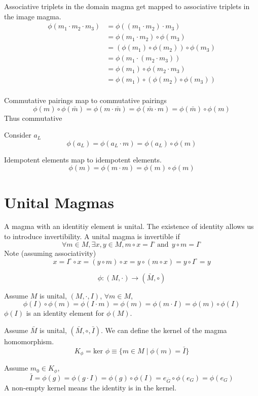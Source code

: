 \documentclass[a4paper]{scrartcl}
\begin{document}
Associative triplets in the domain magma get mapped to associative triplets in the image magma.
\begin{align*}
\phi(m_{1} \cdot m_{2} \cdot m_{3})  
&= \phi((m_{1} \cdot m_{2}) \cdot m_{3}) \\
&= \phi(m_{1} \cdot m_{2}) \circ \phi(m_{3}) \\
&= (\phi(m_{1}) \circ \phi(m_{2})) \circ \phi(m_{3}) \\
&= \phi(m_{1} \cdot (m_{2} \cdot m_{3})) \\
&= \phi(m_{1}) \circ \phi(m_{2} \cdot m_{3}) \\
&= \phi(m_{1}) \circ (\phi(m_{2}) \circ \phi(m_{3}))
\end{align*}\\

Commutative pairings map to commutative pairings
$$\phi(m) \circ \phi(\bar{m}) = \phi(m \cdot \bar{m}) = \phi (\bar{m} \cdot m) = \phi(\bar{m}) \circ \phi(m)$$
Thus commutative



Consider $a_{L}$
$$\phi(a_{L}) = \phi(a_{L} \cdot m) = \phi(a_{L}) \circ \phi(m)$$



Idempotent elements map to idempotent elements.
$$\phi(m) = \phi(m \cdot m) = \phi(m) \circ \phi(m)$$



\section{Unital Magmas}
A magma with an identitiy element is unital. The existence of identity allows us to introduce invertibility. A unital magma is invertible if
$$\forall m\in M, \exists x,y \in M, m\circ x = I^{\circ}\ \text{and}\ \ y\circ m = I^{\circ}$$ 
Note (assuming associativity)
$$x = I^{\circ} \circ x = (y \circ m) \circ x = y \circ (m \circ x) = y \circ I^{\circ} = y $$


$$\phi\colon (M, \cdot) \rightarrow (\bar{M}, \circ)$$

Assume $M$ is unital, $(M, \cdot, I)$, $\forall m\in M$,
$$\phi(I) \circ \phi(m) = \phi(I \cdot m) = \phi(m) = \phi(m \cdot I) = \phi(m) \circ \phi(I)$$
$\phi(I)$ is an identity element for $\phi(M)$.

Assume $\bar{M}$ is unital, $(\bar{M}, \circ, \bar{I})$. We can define the kernel of the magma homomorphism.
$$K_{\phi} = \text{ker }\phi \equiv \{ m\in M \mid \phi(m) = \bar{I}\} $$


Assume $m_{0}\in K_{\phi}$,
$$\bar{I} = \phi(g) = \phi(g \cdot I) = \phi(g) \circ \phi(I) = e_{\bar{G}} \circ \phi(e_{G}) = \phi(e_{G})$$
A non-empty kernel means the identity is in the kernel.
\end{document}
